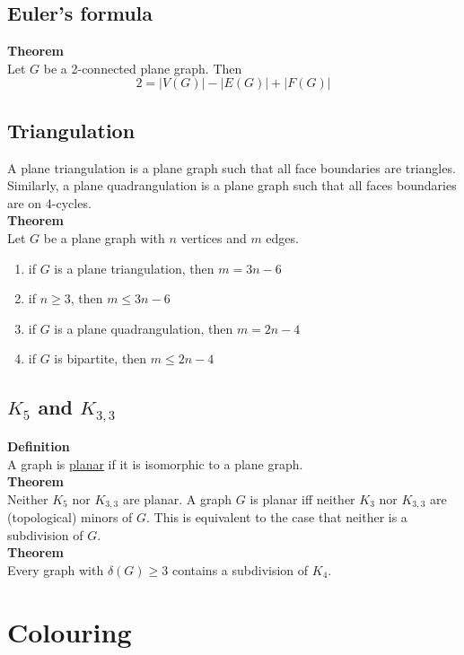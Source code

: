 \documentclass[a4paper, 12pt]{article}
\begin{document}
	\subsection{Euler's formula}
	\textbf{Theorem}\\
	Let $G$ be a 2-connected plane graph. Then \[2 = \left|V(G)\right| - \left|E(G)\right| + \left|F(G)\right|\]
	\subsection{Triangulation}
	A plane triangulation is a plane graph such that all face boundaries are triangles. Similarly, a plane quadrangulation is a plane graph such that all faces boundaries are on 4-cycles.\\
	\textbf{Theorem}\\
	Let $G$ be a plane graph with $n$ vertices and $m$ edges. \begin{enumerate}
		\item if $G$ is a plane triangulation, then $m = 3n-6$
		\item if $n \geq 3$, then $m \leq 3n -6$
		\item if $G$ is a plane quadrangulation, then $m = 2n-4$
		\item if $G$ is bipartite, then $m \leq 2n-4$
	\end{enumerate}
	\subsection{$K_5$ and $K_{3,3}$}
	\textbf{Definition}\\
	A graph is \underline{planar} if it is isomorphic to a plane graph.\\
	\textbf{Theorem}\\
	Neither $K_5$ nor $K_{3,3}$ are planar. A graph $G$ is planar iff neither $K_3$ nor $K_{3,3}$ are (topological) minors of $G$. This is equivalent to the case that neither is a subdivision of $G$.\\
	\textbf{Theorem}\\
	Every graph with $\delta(G) \geq 3$ contains a subdivision of $K_4$.
	\section{Colouring}
\end{document}
